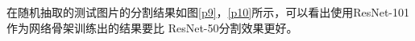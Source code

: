 \documentclass[10pt, a4paper]{article}
\begin{document}
在随机抽取的测试图片的分割结果如图\ref{p9}，\ref{p10}所示，可以看出使用ResNet-101作为网络骨架训练出的结果要比
ResNet-50分割效果更好。


\begin{figure}[h]
    \centering
    \begin{minipage}[b]{0.8\linewidth}
\end{minipage}
\end{figure}
\end{document}
